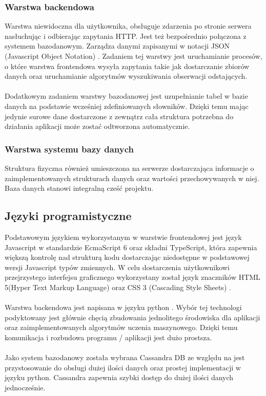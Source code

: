 \documentclass[eng,printmode]{mgr}
\begin{document}
\subsubsection{Warstwa backendowa}
Warstwa niewidoczna dla użytkownika, obsługuje zdarzenia po stronie serwera nasłuchując i odbierając zapytania HTTP. Jest też bezpośrednio połączona z systemem bazodanowym. Zarządza danymi zapisanymi w notacji JSON (Javascript Object Notation) \cite{JSON}. Zadaniem tej warstwy jest uruchamianie procesów, o które warstwa frontendowa wysyła zapytania takie jak dostarczanie zbiorów danych oraz uruchamianie algorytmów wyszukiwania obserwacji odstających.
\\\\
Dodatkowym zadaniem warstwy bazodanowej jest uzupełnianie tabel w bazie danych na podstawie wcześniej zdefiniowanych słowników. Dzięki temu mając jedynie surowe dane dostarczone z zewnątrz cała struktura potrzebna do działania aplikacji może zostać odtworzona automatycznie.
\subsubsection{Warstwa systemu bazy danych}
Struktura fizyczna również umieszczona na serwerze dostarczająca informacje o zaimplementowanych strukturach danych oraz wartości przechowywanych w niej. Baza danych stanowi integralną cześć projektu.
\subsection{Języki programistyczne}
Podstawowym językiem wykorzystanym w warstwie frontendowej jest język Javascript \cite{js} w standardzie EcmaScript 6 \cite{es6} oraz składni TypeScript\cite{ts}, która zapewnia większą kontrolę nad strukturą kodu dostarczając niedostępne w podstawowej wersji Javascript typów zmiennych. W celu dostarczenia użytkownikowi przejrzystego interfejsu graficznego wykorzystany został język znaczników HTML 5(Hyper Text Markup Language)\cite{html} oraz CSS 3 (Cascading Style Sheets) \cite{css}.
\\\\
Warstwa backendowa jest napisana w języku python \cite{python}. Wybór tej technologi podyktowany jest głównie chęcią zbudowania jednolitego środowiska dla aplikacji oraz zaimplementowanych algorytmów uczenia maszynowego. Dzięki temu komunikacja i rozbudowa programu / aplikacji jest dużo prostsza.
\\\\
Jako system bazodanowy została wybrana Cassandra DB \cite{cassandra} ze względu na jest przystosowanie do obsługi  dużej ilości danych oraz prostej implementacji w języku python. Cassandra zapewnia szybki dostęp do dużej ilości danych jednocześnie.
\end{document}
